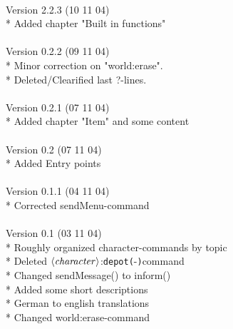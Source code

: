\documentclass[a4paper,10pt,makeidx]{scrreprt}
\newcommand{\com}[2]{\index{#1}\texttt{#1(}#2\texttt{)}}
\newcommand{\var}[1]{$\left\langle \text{\emph{#1}} \right\rangle$}
\begin{document}
\\
Version 2.2.3 (10 11 04)\\
* Added chapter "Built in functions"\\
\\
Version 0.2.2 (09 11 04)\\
* Minor correction on "world:erase".\\
* Deleted/Clearified last ?-lines.\\
\\
Version 0.2.1 (07 11 04)\\
* Added chapter "Item" and some content\\
\\
Version 0.2 (07 11 04)\\
* Added Entry points\\
\\
Version 0.1.1 (04 11 04)\\
* Corrected sendMenu-command\\
\\
Version 0.1 (03 11 04)\\
* Roughly organized character-commands by topic\\
* Deleted \var{character}:\com{depot}-command\\
* Changed sendMessage() to inform()\\
* Added some short descriptions\\
* German to english translations\\
* Changed world:erase-command

\printindex
\end{document}
